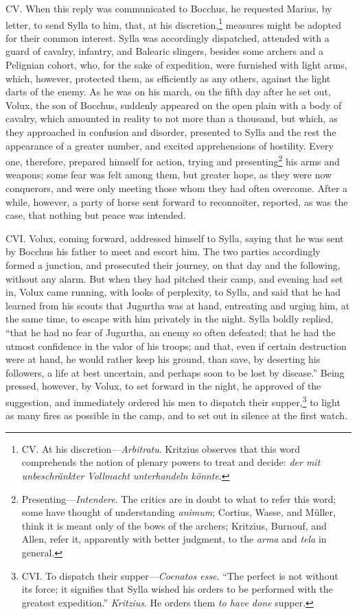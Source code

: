 CV. When this reply was communicated to Bocchus, he requested Marius,
by letter, to send Sylla to him, that, at his discretion,\footnote{CV. At his discretion—\emph{Arbitratu}. Kritzius observes that
this word comprehends the notion of plenary powers to treat and
decide: \emph{der mit unbeschränkter Vollmacht unterhandeln könnte}.}
measures might be adopted for their common interest. Sylla was
accordingly dispatched, attended with a guard of cavalry, infantry,
and Balearic slingers, besides some archers and a Pelignian cohort,
who, for the sake of expedition, were furnished with light arms,
which, however, protected them, as efficiently as any others, against
the light darts of the enemy. As he was on his march, on the fifth day
after he set out, Volux, the son of Bocchus, suddenly appeared on the
open plain with a body of cavalry, which amounted in reality to not
more than a thousand, but which, as they approached in confusion and
disorder, presented to Sylla and the rest the appearance of a greater
number, and excited apprehensions of hostility. Every one, therefore,
prepared himself for action, trying and presenting\footnote{Presenting—\emph{Intendere}. The critics are in doubt to what
to refer this word; some have thought of understanding \emph{animum};
Cortius, Wasse, and Müller, think it is meant only of the bows of the
archers; Kritzius, Burnouf, and Allen, refer it, apparently with
better judgment, to the \emph{arma} and \emph{tela} in general.} his arms and
weapons; some fear was felt among them, but greater hope, as they were
now conquerors, and were only meeting those whom they had often
overcome. After a while, however, a party of horse sent forward to
reconnoiter, reported, as was the case, that nothing but peace was
intended.

CVI. Volux, coming forward, addressed himself to Sylla, saying that he
was sent by Bocchus his father to meet and escort him. The two parties
accordingly formed a junction, and prosecuted their journey, on that
day and the following, without any alarm. But when they had pitched
their camp, and evening had set in, Volux came running, with looks of
perplexity, to Sylla, and said that he had learned from his scouts
that Jugurtha was at hand, entreating and urging him, at the same
time, to escape with him privately in the night. Sylla boldly replied,
``that he had no fear of Jugurtha, an enemy so often defeated; that he
had the utmost confidence in the valor of his troops; and that, even
if certain destruction were at hand, he would rather keep his ground,
than save, by deserting his followers, a life at best uncertain, and
perhaps soon to be lost by disease.'' Being pressed, however, by Volux,
to set forward in the night, he approved of the suggestion, and
immediately ordered his men to dispatch their supper,\footnote{CVI. To dispatch their supper—\emph{Coenatos esse}. ``The perfect is
not without its force; it signifies that Sylla wished his orders to
be performed with the greatest expedition.'' \emph{Kritzius}. He orders them
\emph{to have done} supper.} to light as
many fires as possible in the camp, and to set out in silence at the
first watch.

